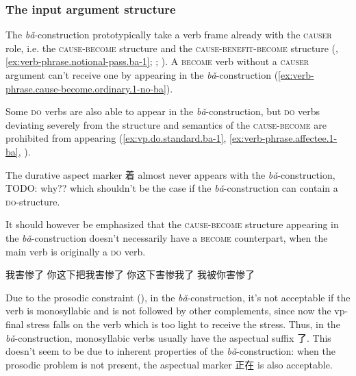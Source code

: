 \documentclass[UTF8, a4paper, oneside, scheme=plain, 12pt]{ctexrep}
\newcommand*{\citepages}[1]{pp.~{#1}}
\newcommand{\form}[1]{\emph{#1}}
\newcommand*{\category}[1]{\textsc{#1}}
\begin{document}
\subsubsection{The input argument structure}
\label{sec:verb-phrase.object.ba.cause-become}

The \form{bǎ}-construction
prototypically take a verb frame already with the \category{causer} role,  
i.e. the \category{cause}-\category{become} structure
and the \category{cause}-\category{benefit}-\category{become} structure
(, 
\ref{ex:verb-phrase.notional-pass.ba-1};
;
\citealt[\citepages{98-99}]{deng2010formal}).
A \category{become} verb without a \category{causer} argument 
can't receive one by appearing in the \form{bǎ}-construction
(\ref{ex:verb-phrase.cause-become.ordinary.1-no-ba}).

Some \category{do} verbs are also able 
to appear in the \form{bǎ}-construction, 
but \category{do} verbs deviating severely from the structure and semantics of  
the \category{cause}-\category{become} 
are prohibited from appearing
(\ref{ex:vp.do.standard.ba-1}, 
\ref{ex:verb-phrase.affectee.1-ba},
).

The durative aspect marker 着 almost never appears 
with the \form{bǎ}-construction, TODO: why?? 
which shouldn't be the case 
if the \form{bǎ}-construction can contain a \category{do}-structure.

It should however be emphasized that the \category{cause}-\category{become} structure 
appearing in the \form{bǎ}-construction 
doesn't necessarily have a \category{become} counterpart,
when the main verb is originally a \category{do} verb.

\begin{exe}
    \ex *我害惨了
    \ex 你这下把我害惨了
    \ex 你这下害惨我了
    \ex 我被你害惨了
\end{exe}

Due to the prosodic constraint (), 
in the \form{bǎ}-construction, 
it's not acceptable if the verb is monosyllabic and is not followed by other complements,
since now the \acs{vp}-final stress 
falls on the verb 
which is too light to receive the stress. 
Thus, in the \form{bǎ}-construction, 
monosyllabic verbs usually have the aspectual suffix 了.
This doesn't seem to be due to inherent properties 
of the \form{bǎ}-construction: 
when the prosodic problem is not present, 
the aspectual marker 正在 is also acceptable.
\end{document}
